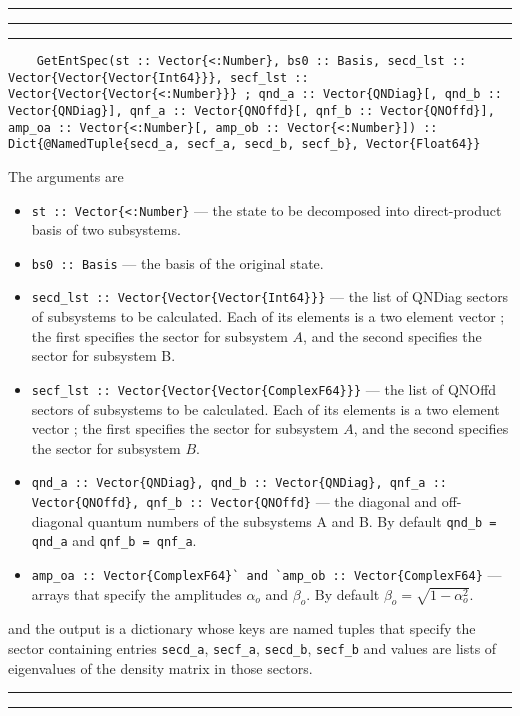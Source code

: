 \documentclass{timesjhep}
\newenvironment{block}[1]{\vspace{0.4\baselineskip}\hrule\vspace{0.10\baselineskip}\hrule\vspace{0.30\baselineskip}{\bfseries #1}\vspace{0.2\baselineskip}\hrule\vspace{0.3\baselineskip}
}{\vspace{0.2\baselineskip}\hrule\vspace{0.10\baselineskip}\hrule\vspace{0.5\baselineskip}}
\begin{document}
\begin{block}{\lstinline|GetEntSpec| --- Function}
\begin{lstlisting}
    GetEntSpec(st :: Vector{<:Number}, bs0 :: Basis, secd_lst :: Vector{Vector{Vector{Int64}}}, secf_lst :: Vector{Vector{Vector{<:Number}}} ; qnd_a :: Vector{QNDiag}[, qnd_b :: Vector{QNDiag}], qnf_a :: Vector{QNOffd}[, qnf_b :: Vector{QNOffd}], amp_oa :: Vector{<:Number}[, amp_ob :: Vector{<:Number}]) :: Dict{@NamedTuple{secd_a, secf_a, secd_b, secf_b}, Vector{Float64}}
\end{lstlisting}
The arguments are 
\begin{itemize}
    \item \lstinline|st :: Vector{<:Number}| --- the state to be decomposed into direct-product basis of two subsystems.
    \item \lstinline|bs0 :: Basis| --- the basis of the original state. 
    \item \lstinline|secd_lst :: Vector{Vector{Vector{Int64}}}| --- the list of QNDiag sectors of subsystems to be calculated. Each of its elements is a two element vector ; the first specifies the sector for subsystem $A$, and the second specifies the sector for subsystem B. 
    \item \lstinline|secf_lst :: Vector{Vector{Vector{ComplexF64}}}| --- the list of QNOffd sectors of subsystems to be calculated. Each of its elements is a two element vector ; the first specifies the sector for subsystem $A$, and the second specifies the sector for subsystem $B$. 
    \item \lstinline|qnd_a :: Vector{QNDiag}, qnd_b :: Vector{QNDiag}, qnf_a :: Vector{QNOffd}, qnf_b :: Vector{QNOffd}| --- the diagonal and off-diagonal quantum numbers of the subsystems A and B. By default \lstinline|qnd_b = qnd_a| and \lstinline|qnf_b = qnf_a|. 
    \item \lstinline|amp_oa :: Vector{ComplexF64}` and `amp_ob :: Vector{ComplexF64}| --- arrays that specify the amplitudes $\alpha_o$ and $\beta_o$. By default $\beta_o=\sqrt{1-\alpha_o^2}$.
\end{itemize}
and the output is a dictionary whose keys are named tuples that specify the sector containing entries \lstinline|secd_a|, \lstinline|secf_a|, \lstinline|secd_b|, \lstinline|secf_b| and values are lists of eigenvalues of the density matrix in those sectors. 
\end{block}
\end{document}
